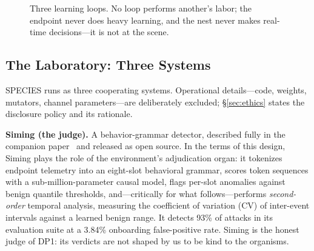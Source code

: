 \documentclass[11pt,a4paper]{article}
\begin{document}
\begin{figure}[t]
\centering
{}
\caption{Three learning loops. No loop performs another's labor; the endpoint never does heavy learning, and the nest never makes real-time decisions---it is not at the scene.}
\label{fig:loops}
\end{figure}

\subsection{The Laboratory: Three Systems}
\label{sec:threesystems}

SPECIES runs as three cooperating systems. Operational details---code, weights, mutators, channel parameters---are deliberately excluded; \S\ref{sec:ethics} states the disclosure policy and its rationale.

\textbf{Siming (the judge).} A behavior-grammar detector, described fully in the companion paper~\cite{luo2026grammar} and released as open source. In the terms of this design, Siming plays the role of the environment's adjudication organ: it tokenizes endpoint telemetry into an eight-slot behavioral grammar, scores token sequences with a sub-million-parameter causal model, flags per-slot anomalies against benign quantile thresholds, and---critically for what follows---performs \emph{second-order} temporal analysis, measuring the coefficient of variation (CV) of inter-event intervals against a learned benign range. It detects 93\% of attacks in its evaluation suite at a 3.84\% onboarding false-positive rate. Siming is the honest judge of DP1: its verdicts are not shaped by us to be kind to the organisms.
\end{document}
